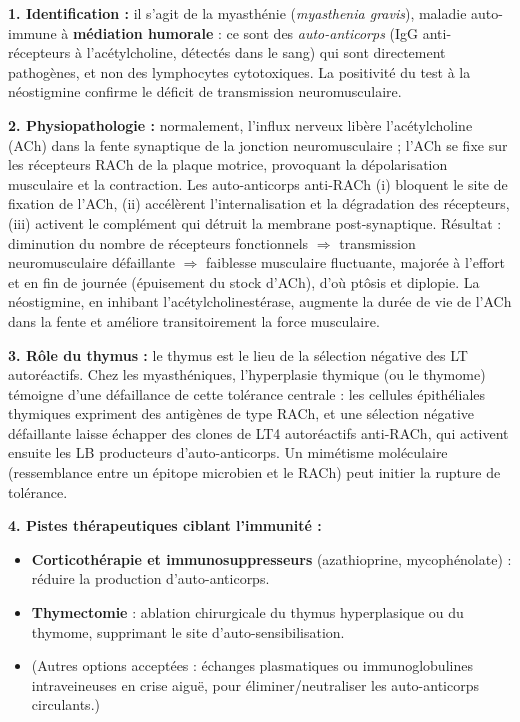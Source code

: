 \documentclass[11pt]{article}
\newcommand{\cle}[1]{{\popxbold\color{popdark}#1}}
\begin{document}
\begin{corrige}
\textbf{1. Identification :} il s'agit de la \cle{myasthénie} (\emph{myasthenia gravis}), maladie auto-immune à \textbf{médiation humorale} : ce sont des \emph{auto-anticorps} (IgG anti-récepteurs à l'acétylcholine, détectés dans le sang) qui sont directement pathogènes, et non des lymphocytes cytotoxiques. La positivité du test à la néostigmine confirme le déficit de transmission neuromusculaire.

\textbf{2. Physiopathologie :} normalement, l'influx nerveux libère l'acétylcholine (ACh) dans la fente synaptique de la jonction neuromusculaire ; l'ACh se fixe sur les récepteurs RACh de la plaque motrice, provoquant la dépolarisation musculaire et la contraction. Les auto-anticorps anti-RACh (i) bloquent le site de fixation de l'ACh, (ii) accélèrent l'internalisation et la dégradation des récepteurs, (iii) activent le complément qui détruit la membrane post-synaptique. Résultat : diminution du nombre de récepteurs fonctionnels $\Rightarrow$ transmission neuromusculaire défaillante $\Rightarrow$ faiblesse musculaire fluctuante, majorée à l'effort et en fin de journée (épuisement du stock d'ACh), d'où ptôsis et diplopie. La néostigmine, en inhibant l'acétylcholinestérase, augmente la durée de vie de l'ACh dans la fente et améliore transitoirement la force musculaire.

\textbf{3. Rôle du thymus :} le thymus est le lieu de la \cle{sélection négative} des LT autoréactifs. Chez les myasthéniques, l'hyperplasie thymique (ou le thymome) témoigne d'une défaillance de cette tolérance centrale : les cellules épithéliales thymiques expriment des antigènes de type RACh, et une sélection négative défaillante laisse échapper des clones de LT4 autoréactifs anti-RACh, qui activent ensuite les LB producteurs d'auto-anticorps. Un \cle{mimétisme moléculaire} (ressemblance entre un épitope microbien et le RACh) peut initier la rupture de tolérance.

\textbf{4. Pistes thérapeutiques ciblant l'immunité :}
\begin{itemize}
    \item \textbf{Corticothérapie et immunosuppresseurs} (azathioprine, mycophénolate) : réduire la production d'auto-anticorps.
    \item \textbf{Thymectomie} : ablation chirurgicale du thymus hyperplasique ou du thymome, supprimant le site d'auto-sensibilisation.
    \item (Autres options acceptées : échanges plasmatiques ou immunoglobulines intraveineuses en crise aiguë, pour éliminer/neutraliser les auto-anticorps circulants.)
\end{itemize}
\end{corrige}
\end{document}
